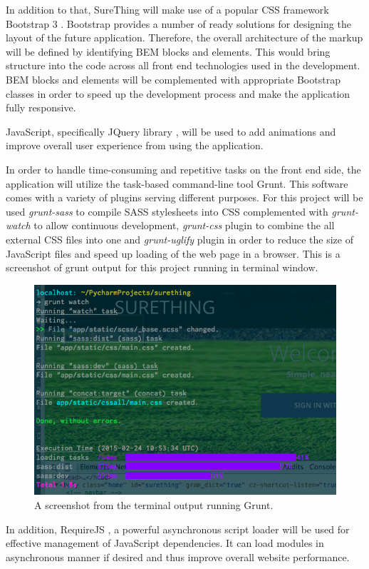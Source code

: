 In addition to that, SureThing will make use of a popular CSS framework Bootstrap 3 \cite{documentation:Bootstrap3}. Bootstrap provides a number of ready solutions for designing the layout of the future application. Therefore, the overall architecture of the markup will be defined by identifying BEM blocks and elements. This would bring structure into the code across all front end technologies used in the development. BEM blocks and elements will be complemented with appropriate Bootstrap classes in order to speed up the development process and make the application fully responsive.
 
JavaScript, specifically JQuery library \cite{documentation:jQuery}, will be used to add animations and improve overall user experience from using the application.  

In order to handle time-consuming and repetitive tasks on the front end side, the application will utilize the task-based command-line tool Grunt. This software comes with a variety of plugins serving different purposes. For this project will be used \emph{grunt-sass} to compile SASS stylesheets into CSS complemented with \emph{grunt-watch} to allow continuous development, \emph{grunt-css} plugin to combine the all external CSS files into one and \emph{grunt-uglify} plugin in order to reduce the size of JavaScript files and speed up loading of the web page in a browser. This is a screenshot of grunt output for this project running in terminal window.

\begin{figure}[H]
	\begin{center}
		\includegraphics[width=.60\linewidth,natwidth=610,natheight=540]{impl/images/gruntInAction}
		\caption{A screenshot from the terminal output running Grunt.} \label{fig:using:gruntInAction}
	\end{center}
\end{figure}
	
In addition, RequireJS  \cite{documentation:RequireJS}, a powerful asynchronous script loader will be used for effective management of JavaScript dependencies. It can load modules in asynchronous manner if desired and thus improve overall website performance.

